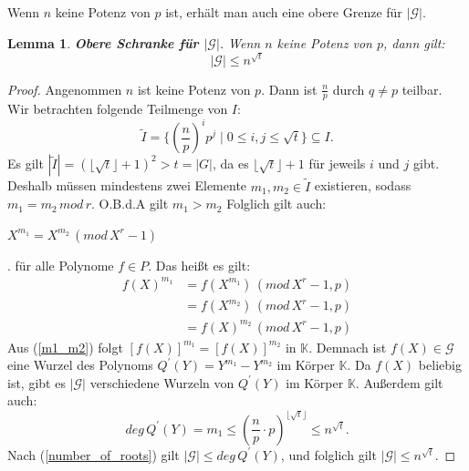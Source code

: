 \documentclass[12pt,oneside]{article}
\newtheorem{lemma}[theorem]{Lemma}
\theoremstyle{remark}
\theoremstyle{definition}
\begin{document}
Wenn $n$ keine Potenz von $p$ ist, erhält man auch eine obere Grenze für $|\mathcal{G}|$.

\begin{lemma}\label{closing_lemma}
\textbf{Obere Schranke für $|\mathcal{G}|$}.\newline
Wenn $n$ keine Potenz von $p$, dann gilt:
\begin{equation}
    |\mathcal{G}| \leq  n^{\sqrt{t}}
\end{equation}
\end{lemma}

\begin{proof}
Angenommen $n$ ist keine Potenz von $p$. Dann ist $\frac{n}{p}$ durch $q \neq p$ teilbar. Wir betrachten folgende Teilmenge von $I$:
\begin{equation}
    \widetilde{I} = \{ (\frac{n}{p})^i p^j \mid 0 \leq i,j \leq \sqrt{t}\} \subseteq I.
\end{equation}
Es gilt $|\widetilde{I}| = (\lfloor \sqrt{t} \rfloor + 1)^2 > t = |G|$, da es $ \lfloor \sqrt{t} \rfloor + 1$ für jeweils $i$ und $j$ gibt. Deshalb müssen mindestens zwei Elemente $m_1,m_2 \in \widetilde{I}$ existieren, sodass $m_1 = m_2 \, mod \, r$. O.B.d.A gilt $m_1 > m_2 $ Folglich gilt auch:\newline\newline
\centerline{$X^{m_1} = X^{m_2} \, (mod \, X^r - 1)$}.
für alle Polynome $ f \in P$. Das heißt es gilt:\newline
\begin{equation}\label{m1_m2}
    \begin{aligned}
         f(X)^{m_1} &= f(X^{m_1}) \, (mod \, X^r - 1, p) \\
        &= f(X^{m_2}) \, (mod \, X^r - 1,p) \\
        &= f(X)^{m_2} \, (mod \, X^r - 1,p)
    \end{aligned}
\end{equation}
Aus (\ref{m1_m2}) folgt $[f(X)]^{m_1} = [f(X)]^{m_2}$ in $\mathbb{K}$. Demnach ist $f(X) \in  \mathcal{G}$ eine Wurzel des Polynoms $Q^{'}(Y) = Y^{m_1} - Y^{m_2}$ im Körper $\mathbb{K}$. Da $f(X)$ beliebig ist, gibt es $|\mathcal{G}|$ verschiedene Wurzeln von $Q^{'}(Y)$ im Körper $\mathbb{K}$. Außerdem gilt auch:
\begin{equation}\label{degQ}
    deg \, Q^{'}(Y) = m_1 \leq (\frac{n}{p} \cdot p)^{\lfloor \sqrt{t} \rfloor} \leq n^{\sqrt{t}}. 
\end{equation}
Nach (\ref{number_of_roots}) gilt $|\mathcal{G}| \leq deg \, Q^{'}(Y)$, und folglich gilt $|\mathcal{G}| \leq n^{\sqrt{t}}$.\newline\newline
\end{proof}
\end{document}
